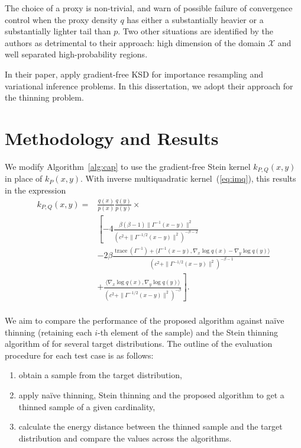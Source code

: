 \documentclass[11pt,a4paper]{report}
\DeclareMathOperator{\trace}{trace}
\begin{document}
The choice of a proxy is non-trivial, and \cite{fisherGradientFreeKernelStein2024} warn of possible failure of convergence control when the proxy density $q$ has either a substantially heavier or a substantially lighter tail than $p$. Two other situations are identified by the authors as detrimental to their approach: high dimension of the domain $\mathcal{X}$ and well separated high-probability regions.

In their paper, \cite{fisherGradientFreeKernelStein2024} apply gradient-free KSD for importance resampling and variational inference problems. In this dissertation, we adopt their approach for the thinning problem.

\chapter{Methodology and Results}

We modify Algorithm~\ref{alg:cap} to use the gradient-free Stein kernel $k_{P,Q}(x,y)$ in place of $k_P(x, y)$. With inverse multiquadratic kernel~(\ref{eq:imq}), this results in the expression
\begin{equation*}
\begin{aligned}
k_{P,Q}(x, y)
= &\frac{q(x)}{p(x)} \frac{q(y)}{p(y)} \times \\
 &\left[ -4 \frac{\beta(\beta-1) \| \Gamma^{-1}(x - y)\|^2}{(c^2 + \| \Gamma^{-1/2}(x-y)\|^2)^{-\beta-2}} \right.  \\
&- 2 \beta \frac{\trace(\Gamma^{-1}) + \langle \Gamma^{-1} (x - y), \nabla_x \log q(x) - \nabla_y \log q(y)\rangle}{(c^2 + \| \Gamma^{-1/2}(x-y)\|^2)^{-\beta-1}} \\
& \left. + \frac{\langle \nabla_x \log q(x), \nabla_y \log q(y) \rangle}{(c^2 + \| \Gamma^{-1/2}(x-y)\|^2)^{-\beta}} \right]. \\
\end{aligned}
\label{eq:k_Q}
\end{equation*}

We aim to compare the performance of the proposed algorithm against na\"ive thinning (retaining each $i$-th element of the sample) and the Stein thinning algorithm of \cite{riabizOptimalThinningMCMC2022} for several target distributions. The outline of the evaluation procedure for each test case is as follows:
\begin{enumerate}
\item obtain a sample from the target distribution,
\item apply na\"ive thinning, Stein thinning and the proposed algorithm to get a thinned sample of a given cardinality,
\item calculate the energy distance between the thinned sample and the target distribution and compare the values across the algorithms.
\end{enumerate}
\end{document}
